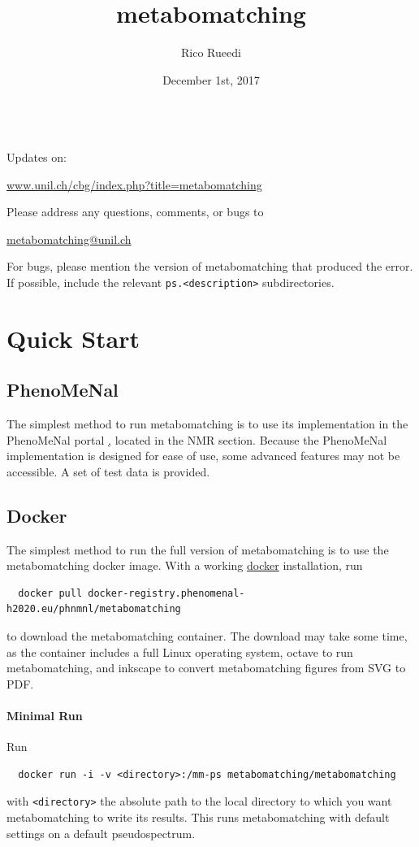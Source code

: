 \documentclass[a4paper,11pt]{article}
\title{metabomatching}
\author{Rico Rueedi}
\date{December 1st, 2017}
\begin{document}
\maketitle\quad\\[16mm]
Updates on:
\begin{center}\href{http://www.unil.ch/cbg/index.php?title=metabomatching}{www.unil.ch/cbg/index.php?title=metabomatching}\end{center}
Please address any questions, comments, or bugs to
\begin{center}
\href{mailto:metabomatching@unil.ch}{metabomatching@unil.ch}
\end{center}
For bugs, please mention the version of metabomatching that produced the error. If possible, include the relevant \verb|ps.<description>| subdirectories.
\tableofcontents
\clearpage
\section{Quick Start}
\subsection{PhenoMeNal}
The simplest method to run metabomatching is to use its implementation in the PhenoMeNal portal \href{http://public.phenomenal-h2020.eu}, located in the NMR section. Because the PhenoMeNal implementation is designed for ease of use, some advanced features may not be accessible. A set of test data is provided.
\subsection{Docker}
The simplest method to run the full version of metabomatching is to use the metabomatching docker image. With a working \href{http://www.docker.com/products/overview}{docker} installation, run
\begin{verbatim}
  docker pull docker-registry.phenomenal-h2020.eu/phnmnl/metabomatching
\end{verbatim}
to download the metabomatching container. The download may take some time, as the container includes a full Linux operating system, octave to run metabomatching, and inkscape to convert metabomatching figures from SVG to PDF. 
\paragraph{Minimal Run} Run
\begin{verbatim}
  docker run -i -v <directory>:/mm-ps metabomatching/metabomatching
\end{verbatim}
with \verb|<directory>| the absolute path to the local directory to which you want metabomatching to write its results. This runs metabomatching with default settings on a default pseudospectrum.
\end{document}
